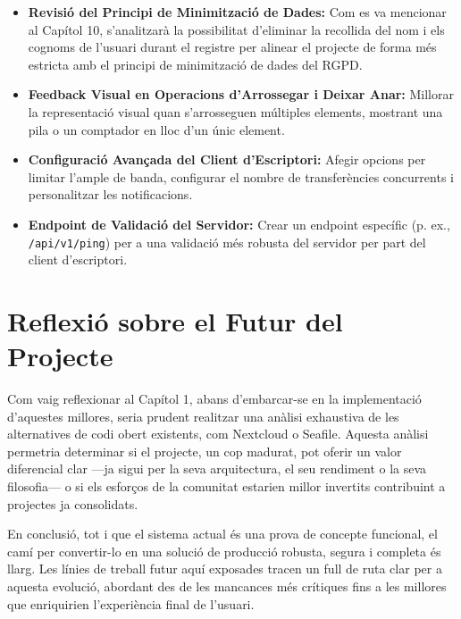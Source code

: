 \begin{itemize}
    \item \textbf{Revisió del Principi de Minimització de Dades:} Com es va mencionar al Capítol 10, s'analitzarà la possibilitat d'eliminar la recollida del nom i els cognoms de l'usuari durant el registre per alinear el projecte de forma més estricta amb el principi de minimització de dades del RGPD.

    \item \textbf{Feedback Visual en Operacions d'Arrossegar i Deixar Anar:} Millorar la representació visual quan s'arrosseguen múltiples elements, mostrant una pila o un comptador en lloc d'un únic element.
    
    \item \textbf{Configuració Avançada del Client d'Escriptori:} Afegir opcions per limitar l'ample de banda, configurar el nombre de transferències concurrents i personalitzar les notificacions.

    \item \textbf{Endpoint de Validació del Servidor:} Crear un endpoint específic (p. ex., \texttt{/api/v1/ping}) per a una validació més robusta del servidor per part del client d'escriptori.
\end{itemize}

\section{Reflexió sobre el Futur del Projecte}

Com vaig reflexionar al Capítol 1, abans d'embarcar-se en la implementació d'aquestes millores, seria prudent realitzar una anàlisi exhaustiva de les alternatives de codi obert existents, com Nextcloud o Seafile. Aquesta anàlisi permetria determinar si el projecte, un cop madurat, pot oferir un valor diferencial clar —ja sigui per la seva arquitectura, el seu rendiment o la seva filosofia— o si els esforços de la comunitat estarien millor invertits contribuint a projectes ja consolidats.

En conclusió, tot i que el sistema actual és una prova de concepte funcional, el camí per convertir-lo en una solució de producció robusta, segura i completa és llarg. Les línies de treball futur aquí exposades tracen un full de ruta clar per a aquesta evolució, abordant des de les mancances més crítiques fins a les millores que enriquirien l'experiència final de l'usuari.
